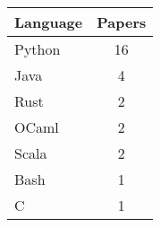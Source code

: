 \begin{tabular}{lc}
\toprule
 Language   &  Papers  \\
\midrule
 Python     &    16    \\
 Java       &    4     \\
 Rust       &    2     \\
 OCaml      &    2     \\
 Scala      &    2     \\
 Bash       &    1     \\
 C          &    1     \\
\bottomrule
\end{tabular}
